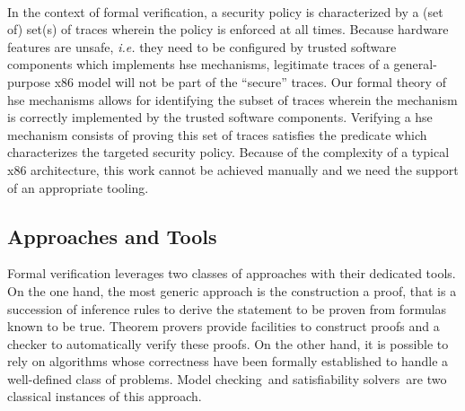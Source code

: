 
\paragraph*{}
%
In the context of formal verification, a security policy is characterized by a
(set of) set(s) of traces wherein the policy is enforced at all times.
%
Because hardware features are unsafe, \emph{i.e.} they need to be configured by
trusted software components which implements \ac{hse} mechanisms, legitimate
traces of a general-purpose x86 model will not be part of the ``secure'' traces.
%
Our formal theory of \ac{hse} mechanisms allows for identifying the subset of
traces wherein the mechanism is correctly implemented by the trusted software
components. Verifying a \ac{hse} mechanism consists of proving this set of
traces satisfies the predicate which characterizes the targeted security policy.
%
Because of the complexity of a typical x86 architecture, this work cannot be
achieved manually and we need the support of an appropriate tooling.

\subsection{Approaches and Tools}
\label{subsec:sota:tools}


Formal verification leverages two classes of approaches with their dedicated
tools.
%
On the one hand, the most generic approach is the construction a proof, that is
a succession of inference rules to derive the statement to be proven from
formulas known to be true.
%
Theorem provers provide facilities to construct proofs and a checker to
automatically verify these proofs.
%
On the other hand, it is possible to rely on algorithms whose correctness have
been formally established to handle a well-defined class of problems.
%
Model checking\,\cite{clarke2018modelc} and satisfiability
solvers\,\cite{gomes2008satisfiability} are two classical instances of this
approach.

